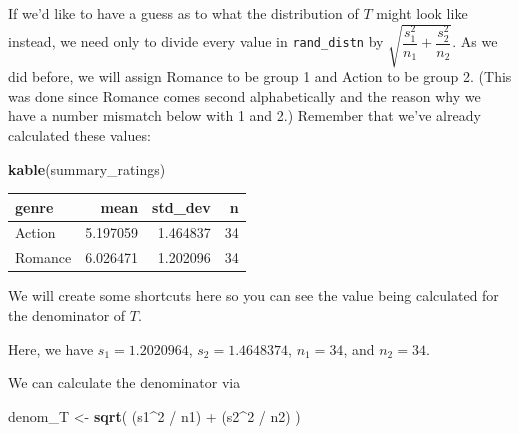 \documentclass[]{tufte-book}
\newenvironment{Shaded}{\begin{snugshade}}{\end{snugshade}}
\newcommand{\KeywordTok}[1]{\textcolor[rgb]{0.13,0.29,0.53}{\textbf{{#1}}}}
\newcommand{\DecValTok}[1]{\textcolor[rgb]{0.00,0.00,0.81}{{#1}}}
\newcommand{\StringTok}[1]{\textcolor[rgb]{0.31,0.60,0.02}{{#1}}}
\newcommand{\NormalTok}[1]{{#1}}
\begin{document}
If we'd like to have a guess as to what the distribution of \(T\) might
look like instead, we need only to divide every value in
\texttt{rand\_distn} by
\(\sqrt{\dfrac{s_1^2}{n_1} + \dfrac{s_2^2}{n_2}}\). As we did before, we
will assign Romance to be group 1 and Action to be group 2. (This was
done since Romance comes second alphabetically and the reason why we
have a number mismatch below with 1 and 2.) Remember that we've already
calculated these values:

\begin{Shaded}
\begin{Highlighting}[]
\KeywordTok{kable}\NormalTok{(summary_ratings)}
\end{Highlighting}
\end{Shaded}

\begin{tabular}{l|r|r|r}
\hline
genre & mean & std\_dev & n\\
\hline
Action & 5.197059 & 1.464837 & 34\\
\hline
Romance & 6.026471 & 1.202096 & 34\\
\hline
\end{tabular}

We will create some shortcuts here so you can see the value being
calculated for the denominator of \(T\).

\begin{Shaded}
\end{Shaded}

Here, we have \(s_1 = 1.2020964\), \(s_2 = 1.4648374\), \(n_1 = 34\),
and \(n_2 = 34\).

We can calculate the denominator via

\begin{Shaded}
\begin{Highlighting}[]
\NormalTok{denom_T <-}\StringTok{ }\KeywordTok{sqrt}\NormalTok{( (s1^}\DecValTok{2} \NormalTok{/}\StringTok{ }\NormalTok{n1) +}\StringTok{ }\NormalTok{(s2^}\DecValTok{2} \NormalTok{/}\StringTok{ }\NormalTok{n2) )}
\end{Highlighting}
\end{Shaded}
\end{document}
